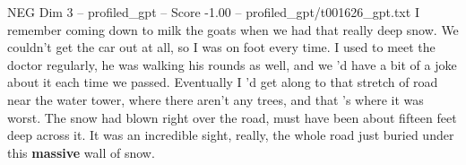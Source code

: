 \begin{textsample}{NEG Dim 3 – profiled\_gpt – Score -1.00 – profiled\_gpt/t001626\_gpt.txt}  \label{ex:f3_neg_029}
I remember coming down to milk the goats when we had that really deep snow.
We couldn't get the car out at all, so I was on foot every time.
I used to meet the doctor regularly, he was walking his rounds as well, and we ’d have a bit of a joke about it each time we passed.
Eventually I ’d get along to that stretch of road near the water tower, where there aren't any trees, and that ’s where it was worst.
The snow had blown right over the road, must have been about fifteen feet deep across it.
It was an incredible sight, really, the whole road just buried under this \textbf{massive} wall of snow.

\end{textsample}
